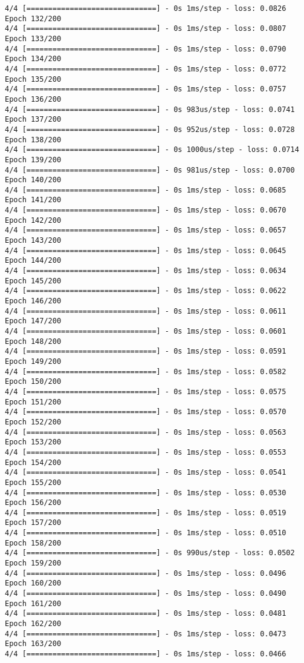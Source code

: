 \documentclass[11pt]{article}
\begin{document}
\begin{Verbatim}[commandchars=\\\{\}]
4/4 [==============================] - 0s 1ms/step - loss: 0.0826
Epoch 132/200
4/4 [==============================] - 0s 1ms/step - loss: 0.0807
Epoch 133/200
4/4 [==============================] - 0s 1ms/step - loss: 0.0790
Epoch 134/200
4/4 [==============================] - 0s 1ms/step - loss: 0.0772
Epoch 135/200
4/4 [==============================] - 0s 1ms/step - loss: 0.0757
Epoch 136/200
4/4 [==============================] - 0s 983us/step - loss: 0.0741
Epoch 137/200
4/4 [==============================] - 0s 952us/step - loss: 0.0728
Epoch 138/200
4/4 [==============================] - 0s 1000us/step - loss: 0.0714
Epoch 139/200
4/4 [==============================] - 0s 981us/step - loss: 0.0700
Epoch 140/200
4/4 [==============================] - 0s 1ms/step - loss: 0.0685
Epoch 141/200
4/4 [==============================] - 0s 1ms/step - loss: 0.0670
Epoch 142/200
4/4 [==============================] - 0s 1ms/step - loss: 0.0657
Epoch 143/200
4/4 [==============================] - 0s 1ms/step - loss: 0.0645
Epoch 144/200
4/4 [==============================] - 0s 1ms/step - loss: 0.0634
Epoch 145/200
4/4 [==============================] - 0s 1ms/step - loss: 0.0622
Epoch 146/200
4/4 [==============================] - 0s 1ms/step - loss: 0.0611
Epoch 147/200
4/4 [==============================] - 0s 1ms/step - loss: 0.0601
Epoch 148/200
4/4 [==============================] - 0s 1ms/step - loss: 0.0591
Epoch 149/200
4/4 [==============================] - 0s 1ms/step - loss: 0.0582
Epoch 150/200
4/4 [==============================] - 0s 1ms/step - loss: 0.0575
Epoch 151/200
4/4 [==============================] - 0s 1ms/step - loss: 0.0570
Epoch 152/200
4/4 [==============================] - 0s 1ms/step - loss: 0.0563
Epoch 153/200
4/4 [==============================] - 0s 1ms/step - loss: 0.0553
Epoch 154/200
4/4 [==============================] - 0s 1ms/step - loss: 0.0541
Epoch 155/200
4/4 [==============================] - 0s 1ms/step - loss: 0.0530
Epoch 156/200
4/4 [==============================] - 0s 1ms/step - loss: 0.0519
Epoch 157/200
4/4 [==============================] - 0s 1ms/step - loss: 0.0510
Epoch 158/200
4/4 [==============================] - 0s 990us/step - loss: 0.0502
Epoch 159/200
4/4 [==============================] - 0s 1ms/step - loss: 0.0496
Epoch 160/200
4/4 [==============================] - 0s 1ms/step - loss: 0.0490
Epoch 161/200
4/4 [==============================] - 0s 1ms/step - loss: 0.0481
Epoch 162/200
4/4 [==============================] - 0s 1ms/step - loss: 0.0473
Epoch 163/200
4/4 [==============================] - 0s 1ms/step - loss: 0.0466

\end{Verbatim}
\end{document}
